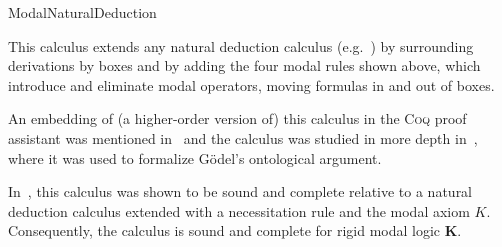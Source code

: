 \begin{entry}{ModalNaturalDeduction}
\begin{calculus}
\end{calculus}


\begin{clarifications}
  This calculus extends any natural deduction calculus (e.g.~) by
  surrounding derivations by boxes and by adding the four modal rules shown above,
  which introduce and eliminate modal operators, moving formulas in and out of
  boxes.
\end{clarifications}

\begin{history}
  An embedding of (a higher-order version of) this calculus in the \textsc{Coq}
  proof assistant was mentioned in~\cite{CSR} and the calculus was studied in more
  depth in~\cite{StudiaLogica}, where it was used to formalize G\"odel's
  ontological argument.
\end{history}

\begin{technicalities}
  In~\cite{StudiaLogica}, this calculus was shown to be sound and complete
  relative to a natural deduction calculus extended with a necessitation rule and
  the modal axiom $K$. Consequently, the calculus is sound and complete for rigid
  modal logic \textbf{K}.
\end{technicalities}


\end{entry}

